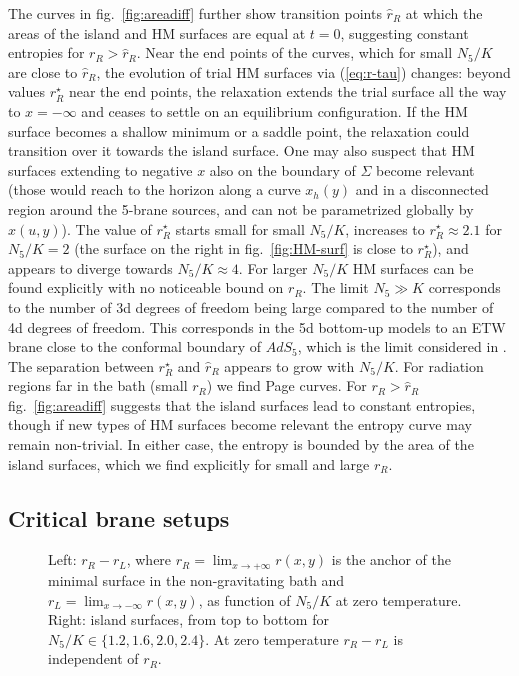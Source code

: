 \documentclass[aps,prd,11pt,notitlepage,longbibliography,nofootinbib,tightenlines,preprintnumbers]{revtex4-1}
\begin{document}
The curves in fig.~\ref{fig:areadiff} further show transition points $\hat r_R$ at which the areas of the island and HM surfaces are equal at $t=0$, suggesting constant entropies for $r_R>\hat r_R$. 
Near the end points of the curves, which for small $N_5/K$ are close to $\hat r_R$, the evolution of trial HM surfaces via (\ref{eq:r-tau}) changes: 
beyond values  $r_R^\star$ near the end points, the relaxation extends the trial surface all the way to $x=-\infty$ and ceases to settle on an equilibrium configuration.
%
If the HM surface becomes a shallow minimum or a saddle point, the relaxation could transition over it towards the island surface. 
One may also suspect that HM surfaces extending to negative $x$ also on the boundary of $\Sigma$ become relevant (those would reach to the horizon along a curve $x_h(y)$ and in a disconnected region around the 5-brane sources, and can not be parametrized globally by $x(u,y)$).
The value of $r_R^\star$ starts small for small $N_5/K$, increases to $r_R^\star\approx 2.1$ for $N_5/K=2$ 
(the surface on the right in fig.~\ref{fig:HM-surf} is close to $r_R^\star$), and appears to diverge towards $N_5/K\approx 4$. 
For larger $N_5/K$ HM surfaces can be found explicitly with no noticeable bound on $r_R$.
The limit $N_5\gg K$ corresponds to the number of 3d degrees of freedom being large compared to the number of 4d degrees of freedom. 
This corresponds in the 5d bottom-up models to an ETW brane close to the conformal boundary of $AdS_5$, which is the limit considered in \cite{Chen:2020uac,Chen:2020hmv}.
The separation between $r_R^\star$ and $\hat r_R$ appears to grow with $N_5/K$.
%
For radiation regions far in the bath (small $r_R$) we find Page curves.
For $r_R>\hat r_R$ fig.~\ref{fig:areadiff} suggests that the island surfaces lead to constant entropies,
though if new types of HM surfaces become relevant the entropy curve may remain non-trivial. 
In either case, the entropy is bounded by the area of the island surfaces, which we find explicitly for small and large $r_R$.



\subsection{Critical brane setups}

\begin{figure}
	\qquad
	\caption{Left: $r_R-r_L$, where $r_R= \lim_{x\rightarrow +\infty}r(x,y)$ is the  anchor of the minimal surface in the non-gravitating bath and $r_L= \lim_{x\rightarrow -\infty}r(x,y)$, as function of $N_5/K$ at zero temperature.
		Right: island surfaces, from top to bottom for $N_5/K\in\lbrace 1.2,1.6,2.0,2.4\rbrace$.
		At zero temperature $r_R-r_L$ is independent of $r_R$.
		\label{fig:crit-ang}}
\end{figure}
\end{document}
